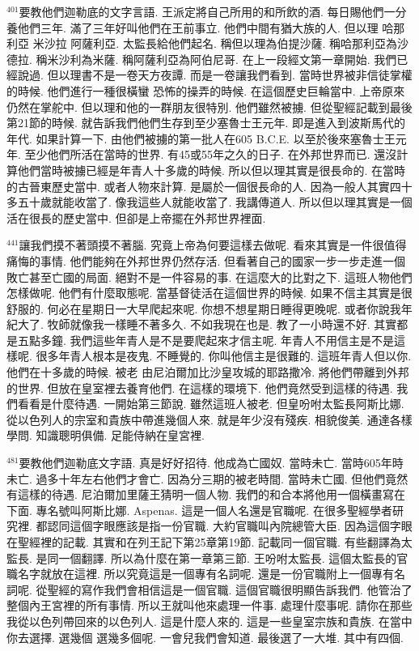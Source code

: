 \documentclass{book}
\begin{document}
$^{401}$要教他們迦勒底的文字言語.
王派定將自己所用的和所飲的酒.
每日賜他們一分養他們三年.
滿了三年好叫他們在王前事立.
他們中間有猶大族的人.
但以理 哈那利亞 米沙拉 阿薩利亞.
太監長給他們起名.
稱但以理為伯提沙薩.
稱哈那利亞為沙德拉.
稱米沙利為米薩.
稱阿薩利亞為阿伯尼哥.
在上一段經文第一章開始.
我們已經說過.
但以理書不是一卷天方夜譚.
而是一卷讓我們看到.
當時世界被非信徒掌權的時候.
他們進行一種很橫蠻 恐怖的操弄的時候.
在這個歷史巨輪當中.
上帝原來仍然在掌舵中.
但以理和他的一群朋友很特別.
他們雖然被擄.
但從聖經記載到最後第21節的時候.
就告訴我們他們生存到至少塞魯士王元年.
即是進入到波斯馬代的年代.
如果計算一下.
由他們被擄的第一批人在605 B.C.E.
以至於後來塞魯士王元年.
至少他們所活在當時的世界.
有45或55年之久的日子.
在外邦世界而已.
還沒計算他們當時被擄已經是年青人十多歲的時候.
所以但以理其實是很長命的.
在當時的古晉東歷史當中.
或者人物來計算.
是屬於一個很長命的人.
因為一般人其實四十多五十歲就能收當了.
像我這些人就能收當了.
我講傳道人.
所以但以理其實是一個活在很長的歷史當中.
但卻是上帝擺在外邦世界裡面.

$^{441}$讓我們摸不著頭摸不著腦.
究竟上帝為何要這樣去做呢.
看來其實是一件很值得痛悔的事情.
他們能夠在外邦世界仍然存活.
但看著自己的國家一步一步走進一個敗亡甚至亡國的局面.
絕對不是一件容易的事.
在這麼大的比對之下.
這班人物他們怎樣做呢.
他們有什麼取態呢.
當基督徒活在這個世界的時候.
如果不信主其實是很舒服的.
何必在星期日一大早爬起來呢.
你想不想星期日睡得更晚呢.
或者你說我年紀大了.
牧師就像我一樣睡不著多久.
不如我現在也是.
教了一小時還不好.
其實都是五點多鐘.
我們這些年青人是不是要爬起來才信主呢.
年青人不用信主是不是這樣呢.
很多年青人根本是夜鬼.
不睡覺的.
你叫他信主是很難的.
這班年青人但以你.
他們在十多歲的時候.
被老 由尼泊爾加比沙皇攻城的耶路撒冷.
將他們帶離到外邦的世界.
但放在皇室裡去養育他們.
在這樣的環境下.
他們竟然受到這樣的待遇.
我們看看是什麼待遇.
一開始第三節說.
雖然這班人被老.
但皇吩咐太監長阿斯比娜.
從以色列人的宗室和貴族中帶進幾個人來.
就是年少沒有殘疾.
相貌俊美.
通達各樣學問.
知識聰明俱備.
足能侍納在皇宮裡.

$^{481}$要教他們迦勒底文字語.
真是好好招待.
他成為亡國奴.
當時未亡.
當時605年時未亡.
過多十年左右他們才會亡.
因為分三期的被老時間.
當時未亡國.
但他們竟然有這樣的待遇.
尼泊爾加里薩王猜明一個人物.
我們的和合本將他用一個橫畫寫在下面.
專名號叫阿斯比娜.
Aspenas.
這是一個人名還是官職呢.
在很多聖經學者研究裡.
都認同這個字眼應該是指一份官職.
大約官職叫內院總管大臣.
因為這個字眼在聖經裡的記載.
其實和在列王記下第25章第19節.
記載同一個官職.
有些翻譯為太監長.
是同一個翻譯.
所以為什麼在第一章第三節.
王吩咐太監長.
這個太監長的官職名字就放在這裡.
所以究竟這是一個專有名詞呢.
還是一份官職附上一個專有名詞呢.
從聖經的寫作我們會相信這是一個官職.
這個官職很明顯告訴我們.
他管治了整個內王宮裡的所有事情.
所以王就叫他來處理一件事.
處理什麼事呢.
請你在那些我從以色列帶回來的以色列人.
這是什麼人來的.
這是一些皇室宗族和貴族.
在當中你去選擇.
選幾個 選幾多個呢.
一會兒我們會知道.
最後選了一大堆.
其中有四個.
\end{document}
